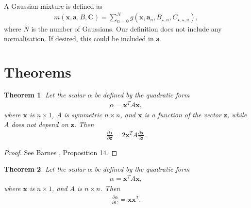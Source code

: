 \documentclass{paper}
\newtheorem{theorem}{Theorem}
\newcommand{\vr}[1]{\ensuremath{\boldsymbol{#1}}}
\newcommand{\mx}[1]{\ensuremath{#1}}
\newcommand{\tr}[1]{\ensuremath{\boldsymbol{#1}}}
\begin{document}
A Gaussian mixture is defined as
\begin{align}
	m(\vr{x}, \vr{a}, B, \tr{C}) = \sum_{n=0}^{N} g(\vr{x}, \vr{a}_n, B_{\star, n}, C_{\star, \star, n}),
\end{align}
where $N$ is the number of Gaussians.
Our definition does not include any normalisation.
If desired, this could be included in $\vr{a}$.

\section{Theorems}
\begin{theorem}
	\label{th:der_xAx_respect_z}
	Let the scalar $\alpha$ be defined by the quadratic form
	\begin{align}
		\alpha = \vr{x}^T \mx{A} \vr{x},
	\end{align}
	where $\vr{x}$ is $n \times 1$, $\mx{A}$ is symmetric $n \times n$, and $\vr{x}$ is a function of the vector $\vr{z}$, while $\mx{A}$ does not depend on $\vr{z}$. Then
	\begin{align}
		\frac{\partial \alpha}{\partial \vr{z}} = 2 \vr{x}^T \mx{A}\frac{\partial \vr{x}}{\partial \vr{z}}.
	\end{align}
\end{theorem}

\begin{proof}
	See Barnes \cite{Barnes}, Proposition 14.
\end{proof}

\begin{theorem}
	\label{th:der_xAx_respect_A}
	Let the scalar $\alpha$ be defined by the quadratic form
	\begin{align}
	\alpha = \vr{x}^T \mx{A} \vr{x},
	\end{align}
	where $\vr{x}$ is $n \times 1$, and $\mx{A}$ is $n \times n$. Then
	\begin{align}
	\frac{\partial \alpha}{\partial \mx{C}} = \vr{x} \vr{x}^T.
	\end{align}
\end{theorem}
\end{document}
